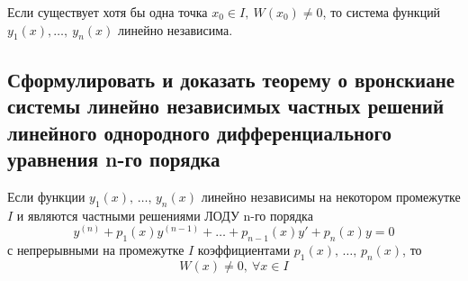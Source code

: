 \begin{assertion}
    Если существует хотя бы одна точка $x_0 \in I,\ W(x_0) \ne 0$, то система функций \break$y_1(x), \ldots,\ y_n(x)$ линейно независима.    
\end{assertion}

\subsection{Сформулировать и доказать теорему о вронскиане системы линейно независимых частных решений линейного однородного дифференциального уравнения n-го порядка}

\begin{theorem}
    Если функции $y_1(x),\, \ldots,\, y_n(x)$ линейно независимы  на некотором промежутке $I$ и являются частными решениями ЛОДУ n-го порядка
    \[
        y^{(n)} + p_1(x)y^{(n-1)} + \ldots + p_{n-1}(x) y' + p_n(x) y = 0
    \]
    с непрерывными на промежутке $I$ коэффициентами $p_1(x),\, \ldots,\, p_n(x)$, то 
    \[
        W(x) \ne 0,\ \forall x \in I
    \]
\end{theorem}
